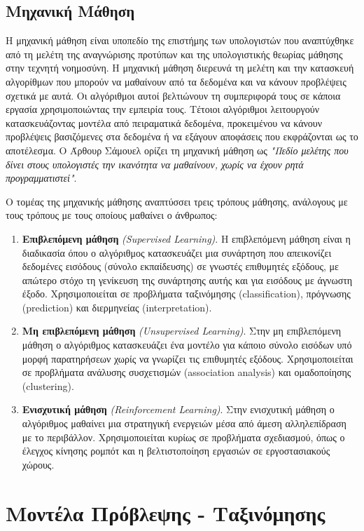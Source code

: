 \documentclass[diploma]{softlab-thesis}
\begin{document}
\subsection{Μηχανική Μάθηση}

Η μηχανική μάθηση είναι υποπεδίο της επιστήμης των υπολογιστών που αναπτύχθηκε από τη μελέτη της αναγνώρισης προτύπων και της υπολογιστικής θεωρίας μάθησης στην τεχνητή νοημοσύνη. Η μηχανική μάθηση διερευνά τη μελέτη και την κατασκευή αλγορίθμων που μπορούν να μαθαίνουν από τα δεδομένα και να κάνουν προβλέψεις σχετικά με αυτά. Οι αλγόριθμοι αυτοί βελτιώνουν τη συμπεριφορά τους σε κάποια εργασία χρησιμοποιώντας την εμπειρία τους. Τέτοιοι αλγόριθμοι λειτουργούν κατασκευάζοντας μοντέλα από πειραματικά δεδομένα, προκειμένου να κάνουν προβλέψεις βασιζόμενες στα δεδομένα ή να εξάγουν αποφάσεις που εκφράζονται ως το αποτέλεσμα. Ο Άρθουρ Σάμουελ ορίζει τη μηχανική μάθηση ως \textit{"Πεδίο μελέτης που δίνει στους υπολογιστές την ικανότητα να μαθαίνουν, χωρίς να έχουν ρητά προγραμματιστεί"}.

Ο τομέας της μηχανικής μάθησης αναπτύσσει τρεις τρόπους μάθησης, ανάλογους με
τους τρόπους με τους οποίους μαθαίνει ο άνθρωπος:
\begin{enumerate}
\item \textbf{Επιβλεπόμενη μάθηση} \textit{(Supervised Learning)}. Η επιβλεπόμενη μάθηση είναι η διαδικασία όπου ο αλγόριθμος κατασκευάζει μια συνάρτηση που απεικονίζει δεδομένες εισόδους
(σύνολο εκπαίδευσης) σε γνωστές επιθυμητές εξόδους, με απώτερο στόχο τη γενίκευση της
συνάρτησης αυτής και για εισόδους με άγνωστη έξοδο. Χρησιμοποιείται σε προβλήματα
ταξινόμησης (classification), πρόγνωσης (prediction) και διερμηνείας (interpretation).
\item \textbf{Μη επιβλεπόμενη μάθηση} \textit{(Unsupervised Learning)}. Στην μη επιβλεπόμενη μάθηση ο
αλγόριθμος κατασκευάζει ένα μοντέλο για κάποιο σύνολο εισόδων υπό μορφή
παρατηρήσεων χωρίς να γνωρίζει τις επιθυμητές εξόδους. Χρησιμοποιείται σε προβλήματα
ανάλυσης συσχετισμών (association analysis) και ομαδοποίησης (clustering).
\item \textbf{Ενισχυτική μάθηση}
 \textit{(Reinforcement Learning)}. Στην ενισχυτική μάθηση ο αλγόριθμος
μαθαίνει μια στρατηγική ενεργειών μέσα από άμεση αλληλεπίδραση με το περιβάλλον.
Χρησιμοποιείται κυρίως σε προβλήματα σχεδιασμού, όπως ο έλεγχος κίνησης ρομπότ και η
βελτιστοποίηση εργασιών σε εργοστασιακούς χώρους.
\end{enumerate}

\section{Μοντέλα Πρόβλεψης - Ταξινόμησης}
\end{document}
